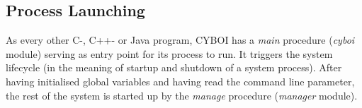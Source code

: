 %
%
%
%
%
%
%

\subsection{Process Launching}
\label{process_launching_heading}

As every other C-, C++- or Java program, CYBOI has a \emph{main} procedure
(\emph{cyboi} module) serving as entry point for its process to run. It
triggers the system lifecycle (in the meaning of startup and shutdown of a
system process). After having initialised global variables and having read the
command line parameter, the rest of the system is started up by the
\emph{manage} procedure (\emph{manager} module).
